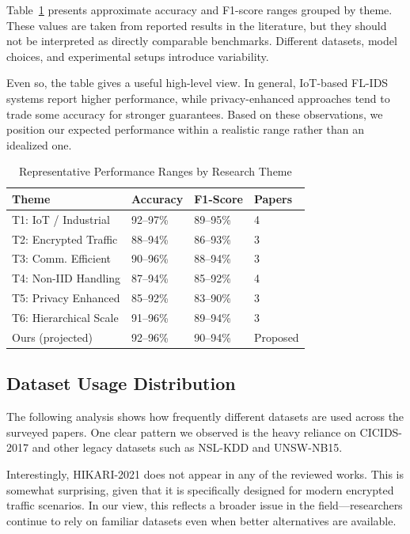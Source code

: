 \documentclass[conference]{IEEEtran}
\begin{document}
Table~\ref{tab:theme_performance} presents approximate accuracy and F1-score ranges grouped by theme. These values are taken from reported results in the literature, but they should not be interpreted as directly comparable benchmarks. Different datasets, model choices, and experimental setups introduce variability.

Even so, the table gives a useful high-level view. In general, IoT-based FL-IDS systems report higher performance, while privacy-enhanced approaches tend to trade some accuracy for stronger guarantees. Based on these observations, we position our expected performance within a realistic range rather than an idealized one.

\begin{table}[h]
\centering
\caption{Representative Performance Ranges by Research Theme}
\label{tab:theme_performance}
\begin{tabular}{llll}
\hline
\textbf{Theme} & \textbf{Accuracy} & \textbf{F1-Score} & \textbf{Papers} \\
\hline
T1: IoT / Industrial       & 92--97\% & 89--95\% & 4 \\
T2: Encrypted Traffic      & 88--94\% & 86--93\% & 3 \\
T3: Comm. Efficient        & 90--96\% & 88--94\% & 3 \\
T4: Non-IID Handling       & 87--94\% & 85--92\% & 4 \\
T5: Privacy Enhanced       & 85--92\% & 83--90\% & 3 \\
T6: Hierarchical Scale     & 91--96\% & 89--94\% & 3 \\
Ours (projected)           & 92--96\% & 90--94\% & Proposed \\
\hline
\end{tabular}
\end{table}

\subsection{Dataset Usage Distribution}

The following analysis shows how frequently different datasets are used across the surveyed papers. One clear pattern we observed is the heavy reliance on CICIDS-2017 and other legacy datasets such as NSL-KDD and UNSW-NB15.

Interestingly, HIKARI-2021 does not appear in any of the reviewed works. This is somewhat surprising, given that it is specifically designed for modern encrypted traffic scenarios. In our view, this reflects a broader issue in the field---researchers continue to rely on familiar datasets even when better alternatives are available.
\end{document}
